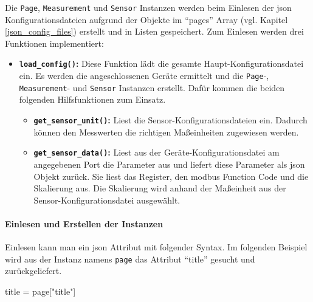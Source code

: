 Die \lstinline{Page}, \lstinline{Measurement} und \lstinline{Sensor} Instanzen werden beim Einlesen der \acs{json} Konfigurationsdateien aufgrund der Objekte im \enquote{pages}  Array (vgl. Kapitel \ref{json_config_files}) erstellt und in Listen gespeichert. \newline
Zum Einlesen werden drei Funktionen implementiert:
\begin{itemize}
	\item \textbf{\lstinline{load_config()}:} Diese Funktion lädt die gesamte Haupt-Konfigurationsdatei ein. Es werden die angeschlossenen Geräte ermittelt und die \lstinline{Page}-, \lstinline{Measurement}- und \lstinline{Sensor} Instanzen erstellt. Dafür kommen die beiden folgenden Hilfsfunktionen zum Einsatz.
    \begin{itemize}
		\item \textbf{\lstinline{get_sensor_unit()}:} Liest die Sensor-Konfigurationsdateien ein. Dadurch können den Messwerten die richtigen Maßeinheiten zugewiesen werden.
		\item \textbf{\lstinline{get_sensor_data()}:} Liest aus der Geräte-Konfigurationsdatei am angegebenen Port die Parameter aus und liefert diese Parameter als \acs{json} Objekt zurück. Sie liest das Register, den \gls{modbus} Function Code und die Skalierung aus. Die Skalierung wird anhand der Maßeinheit aus der Sensor-Konfigurationsdatei ausgewählt.
	\end{itemize}
\end{itemize}

\paragraph{Einlesen und Erstellen der Instanzen}
Einlesen kann man ein \acs{json} Attribut mit folgender Syntax. Im folgenden Beispiel wird aus der Instanz namens \lstinline{page} das Attribut \enquote{title} gesucht und zurückgeliefert.
\begin{pythoncode}
title = page["title"]
\end{pythoncode}

